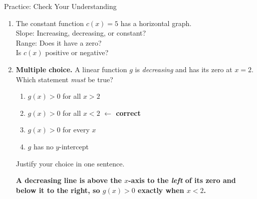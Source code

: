 \documentclass[12pt]{article}
\newcommand{\answerspace}[2]{\par\nopagebreak\noindent\begin{minipage}[t][#1][t]{\linewidth}%
  \color{keyred}\bfseries #2\end{minipage}\par}
\begin{document}
\begin{notesbox}{Practice: Check Your Understanding}
\begin{enumerate}[leftmargin=1.7em, itemsep=10pt]
  \item The constant function $c(x) = 5$ has a horizontal graph. \\[8pt]
        Slope:  \qquad Increasing, decreasing, or constant?  \\[8pt]
        Range:  \qquad Does it have a zero?  \\[8pt]
        Is $c(x)$ positive or negative? 

  \item \textbf{Multiple choice.} A linear function $g$ is \emph{decreasing} and has its zero at
        $x=2$. Which statement \emph{must} be true?
    \begin{enumerate}[label=\Alph*., leftmargin=2.2em, itemsep=3pt]
      \item $g(x)>0$ for all $x>2$
      \item $g(x)>0$ for all $x<2$ \textcolor{keyred}{\textbf{$\leftarrow$ correct}}
      \item $g(x)>0$ for every $x$
      \item $g$ has no $y$-intercept
    \end{enumerate}
    Justify your choice in one sentence.
    \answerspace{1.6cm}{A decreasing line is above the $x$-axis to the \emph{left} of its zero and below it to the right, so $g(x)>0$ exactly when $x<2$.}
\end{enumerate}
\end{notesbox}
\end{document}
